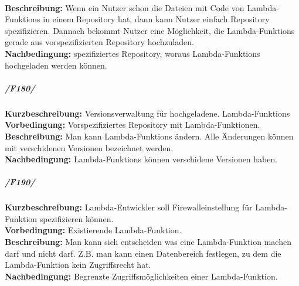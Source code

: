 \documentclass[a4paper,20pt,oneside]{book}
\begin{document}
\\
\textbf{Beschreibung:} Wenn ein Nutzer schon die Dateien mit Code von \Glspl{Lambda-Funktion} in einem Repository hat, dann kann Nutzer einfach Repository spezifizieren. Dannach bekommt Nutzer eine Möglichkeit, die \Glspl{Lambda-Funktion} gerade aus vorspezifizierten Repository hochzuladen. 
\\
\textbf{Nachbedingung:} spezifiziertes Repository, woraus \Glspl{Lambda-Funktion} hochgeladen werden können.
\subparagraph{/F180/}
\textbf{Kurzbeschreibung:} Versionsverwaltung für hochgeladene. \glspl{Lambda-Funktion}
\\
\textbf{Vorbedingung:} Vorspezifiziertes Repository mit Lambda-Funktionen.
\\
\textbf{Beschreibung:} Man kann \Glspl{Lambda-Funktion} ändern. Alle Änderungen können mit verschidenen Versionen bezeichnet werden.
\\
\textbf{Nachbedingung:} \Glspl{Lambda-Funktion} können verschidene Versionen haben.
\subparagraph{/F190/}
\textbf{Kurzbeschreibung:} \gls{Lambda-Entwickler} soll Firewalleinstellung für \gls{Lambda-Funktion} spezifizieren können.
\\
\textbf{Vorbedingung:} Existierende \gls{Lambda-Funktion}.
\\
\textbf{Beschreibung:} Man kann sich entscheiden was eine \gls{Lambda-Funktion} machen darf und nicht darf. Z.B. man kann einen Datenbereich festlegen, zu dem die \gls{Lambda-Funktion} kein Zugriffsrecht hat.
\\
\textbf{Nachbedingung:} Begrenzte Zugriffsmöglichkeiten einer \gls{Lambda-Funktion}.
\end{document}

